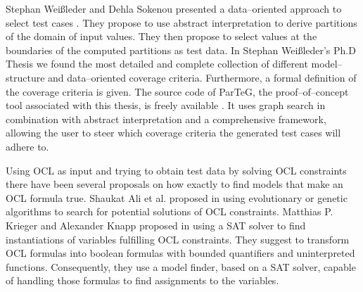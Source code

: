 \documentclass[runningheads,a4paper]{llncs}%
\begin{document}
Stephan Wei{\ss}leder and Dehla Sokenou presented a data--oriented approach to select test cases \cite{weissleder2008automatic}. They propose to use abstract interpretation to derive partitions of the domain of input values. They then propose to select values at the boundaries of the computed partitions as test data. In Stephan Wei{\ss}leder's Ph.D Thesis \cite{ParTeG} we found the most detailed and complete collection of different model--structure and data--oriented coverage criteria. Furthermore, a formal definition of the coverage criteria is given. The source code of ParTeG, the proof--of--concept tool associated with this thesis, is freely available \cite{PartegWebsite}. It uses graph search in combination with abstract interpretation and a comprehensive framework, allowing the user to steer which coverage criteria the generated test cases will adhere to.

Using OCL as input and trying to obtain test data by solving OCL constraints there have been several proposals on how exactly to find models that make an OCL formula true. Shaukat Ali et al. proposed in \cite{ali2011search} using evolutionary or genetic algorithms to search for potential solutions of OCL constraints. Matthias P. Krieger and Alexander Knapp proposed in \cite{krieger2008executingUnderspecifiedOCL} using a SAT solver to find instantiations of variables fulfilling OCL constraints. They suggest to transform OCL formulas into boolean formulas with bounded quantifiers and uninterpreted functions. Consequently, they use a model finder, based on a SAT solver, capable of handling those formulas to find assignments to the variables.
\end{document}
